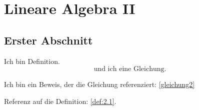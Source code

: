 \chapter{Lineare Algebra II} %
\label{cha:2}

\section{Erster Abschnitt}

\begin{definition}
	\label{def:2.1}
	Ich bin Definition.
	\begin{equation}
		\text{und ich eine Gleichung.} \label{gleichung2}
	\end{equation}
\end{definition}

\begin{beweis}
	Ich bin ein Beweis, der die Gleichung referenziert: \eqref{gleichung2}
\end{beweis}

Referenz auf die Definition: \ref{def:2.1}.


\cleardoubleoddemptypage